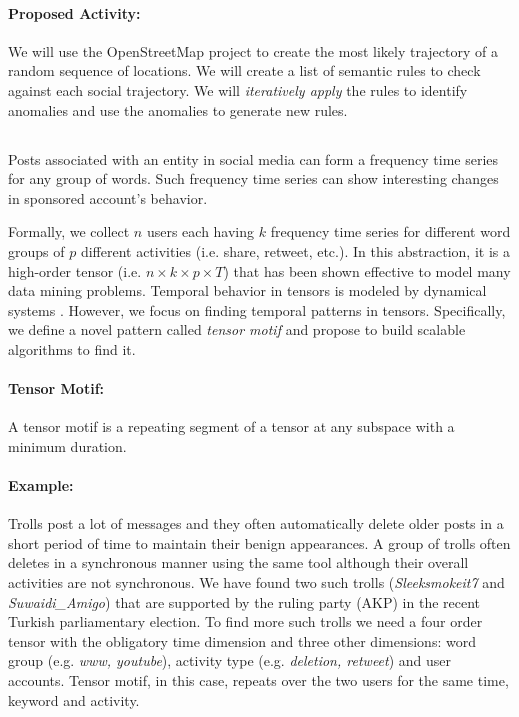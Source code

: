 

\paragraph{Proposed Activity:}

We will use the OpenStreetMap project to create the most likely trajectory of a random sequence of locations. We will create a list of semantic rules to check against each social trajectory. We will {\it iteratively apply} the rules to identify anomalies and use the anomalies to generate new rules.


\subsection{\Ttwofour}

Posts associated with an entity in social media can form a frequency time series for any group of words. Such frequency time series can show interesting changes in sponsored account's behavior. 


Formally, we collect $n$ users each having $k$ frequency time series for different word groups of $p$ different activities (i.e. share, retweet, etc.). In this abstraction, it is a high-order tensor (i.e. $n\times k\times p\times T$) that has been shown effective to model many data mining problems. Temporal behavior in tensors is modeled by dynamical systems \cite{Rogers2013,Yongjie2015}. However, we focus on finding temporal patterns in tensors. Specifically, we define a novel pattern called {\it tensor motif} and propose to build scalable algorithms to find it.



\paragraph{Tensor Motif:} A tensor motif is a repeating segment of a tensor at any subspace with a minimum duration.


\paragraph{Example:} Trolls post a lot of messages and they often automatically delete older posts in a short period of time to maintain their benign appearances. A group of trolls often deletes in a synchronous manner using the same tool although their overall activities are not synchronous. We have found two such trolls ({\it Sleeksmokeit7} and {\it Suwaidi\_Amigo}) that are supported by the ruling party (AKP) in the recent Turkish parliamentary election. To find more such trolls we need a four order tensor with the obligatory time dimension and three other dimensions: word group (e.g. {\it www, youtube}), activity type (e.g. {\it deletion, retweet}) and user accounts. Tensor motif, in this case, repeats over the two users for the same time, keyword and activity. 


